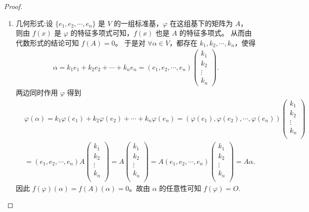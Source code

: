 \documentclass[../../main.tex]{subfiles}%
\begin{document}
\begin{proof}
\begin{enumerate}
\item {\heiti 几何形式:}设 $\{ e_1,e_2,\cdots ,e_n \}$ 是 $V$ 的一组标准基，$\varphi$ 在这组基下的矩阵为 $A$，  
则由 $f(x)$ 是 $\varphi$ 的特征多项式可知，$f(x)$ 也是 $A$ 的特征多项式。  
从而由代数形式的结论可知 $f(A) = 0$。  
于是对 $\forall \alpha \in V$，都存在 $k_1,k_2,\cdots ,k_n$，使得  
\begin{align*}
\alpha = k_1e_1+k_2e_2+\cdots +k_ne_n 
= \left( e_1,e_2,\cdots ,e_n \right) \begin{pmatrix}
k_1\\
k_2\\
\vdots\\
k_n
\end{pmatrix}.
\end{align*}
两边同时作用 $\varphi$ 得到  
\begin{align*}
&\varphi \left( \alpha \right) =k_1\varphi \left( e_1 \right) +k_2\varphi \left( e_2 \right) +\cdots +k_n\varphi \left( e_n \right) =\left( \varphi \left( e_1 \right) ,\varphi \left( e_2 \right) ,\cdots ,\varphi \left( e_n \right) \right) \left( \begin{array}{c}
k_1\\
k_2\\
\vdots\\
k_n\\
\end{array} \right) 
\\
&=\left( e_1,e_2,\cdots ,e_n \right) A\left( \begin{array}{c}
k_1\\
k_2\\
\vdots\\
k_n\\
\end{array} \right) =A\left( \begin{array}{c}
k_1\\
k_2\\
\vdots\\
k_n\\
\end{array} \right) =A\left( e_1,e_2,\cdots ,e_n \right) \left( \begin{array}{c}
k_1\\
k_2\\
\vdots\\
k_n\\
\end{array} \right) =A\alpha .
\end{align*}
因此 $f(\varphi)(\alpha) = f(A)(\alpha) = 0$。故由 $\alpha$ 的任意性可知 $f(\varphi) = O$.
\end{enumerate}

\end{proof}
\end{document}
